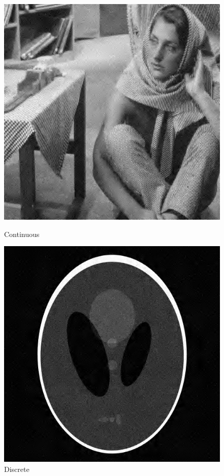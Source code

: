 \documentclass{article}
\begin{document}
    \begin{figure}[!htb]
      \includegraphics[scale=0.4]{3/.report/denoising/bn/0_0_125000.jpg}
      \caption{Continuous}
    \endminipage \hfill
      \includegraphics[scale=.4]{3/.report/denoising/bn/0_0_097500.jpg}
      \caption{Discrete}
    \endminipage
    \end{figure}
\end{document}
